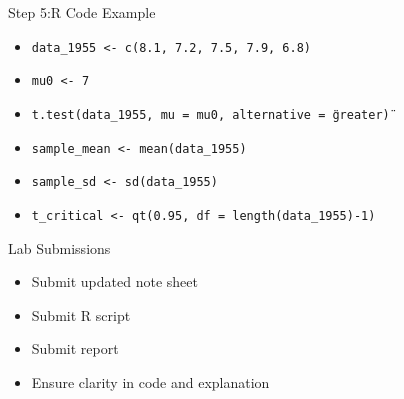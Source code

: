 \documentclass{beamer}
\begin{document}
\begin{frame}{Step 5:R Code Example }
\begin{itemize}
    \item \texttt{data\_1955 <- c(8.1, 7.2, 7.5, 7.9, 6.8)}
    \item \texttt{mu0 <- 7}
    \item \texttt{t.test(data\_1955, mu = mu0, alternative = \"greater\")}
    \item \texttt{sample\_mean <- mean(data\_1955)}
    \item \texttt{sample\_sd <- sd(data\_1955)}
    \item \texttt{t\_critical <- qt(0.95, df = length(data\_1955)-1)}
\end{itemize}
\end{frame}

\begin{frame}{Lab Submissions}
\begin{itemize}
    \item Submit updated note sheet
    \item Submit R script 
    \item Submit report
    \item Ensure clarity in code and explanation
\end{itemize}
\end{frame}
\end{document}
